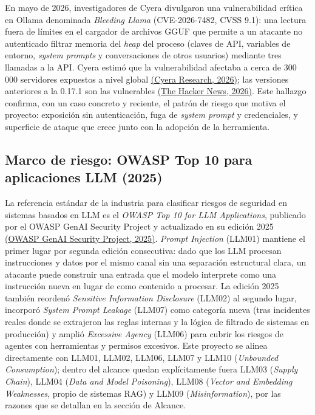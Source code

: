 \documentclass[11pt,letterpaper]{article}
\newcommand{\citeapa}[2]{\hyperlink{#1}{#2}}
\begin{document}
En mayo de 2026, investigadores de Cyera divulgaron una vulnerabilidad crítica en Ollama denominada \emph{Bleeding Llama} (CVE-2026-7482, CVSS 9.1): una lectura fuera de límites en el cargador de archivos GGUF que permite a un atacante no autenticado filtrar memoria del \emph{heap} del proceso (claves de API, variables de entorno, \emph{system prompts} y conversaciones de otros usuarios) mediante tres llamadas a la API. Cyera estimó que la vulnerabilidad afectaba a cerca de 300\,000 servidores expuestos a nivel global \citeapa{cyera2026}{(Cyera Research, 2026)}; las versiones anteriores a la 0.17.1 son las vulnerables \citeapa{thn2026}{(The Hacker News, 2026)}. Este hallazgo confirma, con un caso concreto y reciente, el patrón de riesgo que motiva el proyecto: exposición sin autenticación, fuga de \emph{system prompt} y credenciales, y superficie de ataque que crece junto con la adopción de la herramienta.

\subsection{Marco de riesgo: OWASP Top 10 para aplicaciones LLM (2025)}

La referencia estándar de la industria para clasificar riesgos de seguridad en sistemas basados en LLM es el \emph{OWASP Top 10 for LLM Applications}, publicado por el OWASP GenAI Security Project y actualizado en su edición 2025 \citeapa{owasp2025}{(OWASP GenAI Security Project, 2025)}. \emph{Prompt Injection} (LLM01) mantiene el primer lugar por segunda edición consecutiva: dado que los LLM procesan instrucciones y datos por el mismo canal sin una separación estructural clara, un atacante puede construir una entrada que el modelo interprete como una instrucción nueva en lugar de como contenido a procesar. La edición 2025 también reordenó \emph{Sensitive Information Disclosure} (LLM02) al segundo lugar, incorporó \emph{System Prompt Leakage} (LLM07) como categoría nueva (tras incidentes reales donde se extrajeron las reglas internas y la lógica de filtrado de sistemas en producción) y amplió \emph{Excessive Agency} (LLM06) para cubrir los riesgos de agentes con herramientas y permisos excesivos. Este proyecto se alinea directamente con LLM01, LLM02, LLM06, LLM07 y LLM10 (\emph{Unbounded Consumption}); dentro del alcance quedan explícitamente fuera LLM03 (\emph{Supply Chain}), LLM04 (\emph{Data and Model Poisoning}), LLM08 (\emph{Vector and Embedding Weaknesses}, propio de sistemas RAG) y LLM09 (\emph{Misinformation}), por las razones que se detallan en la sección de Alcance.
\end{document}
